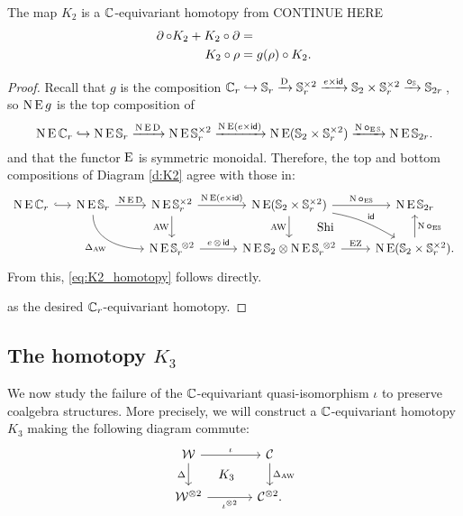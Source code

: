 \begin{lemma}
	The map $K_2$ is a $\mathbb{C}$-equivariant homotopy from CONTINUE HERE
	\begin{align}
		\label{eq:K2_homotopy}
		\operatorname{\partial} \circ K_2 + K_2 \circ \operatorname{\partial} &=  \\
		\label{eq:K2_equivariant}
		K_2 \circ \rho &= g(\rho) \circ K_2.
	\end{align}
\end{lemma}

\begin{proof}
	Recall that $g$ is the composition $\mathbb{C}_r \hookrightarrow \mathbb{S}_r \xrightarrow{\mathrm{D}} \mathbb{S}_r^{\times 2} \xrightarrow{e \times \mathsf{id}} \mathbb{S}_2 \times \mathbb{S}_r^{\times 2} \xrightarrow{\bm{\circ}_{\mathbb{S}}} \mathbb{S}_{2r}$\,, so $\operatorname{N}\operatorname{E} g$ is the top composition of
	\[
	\operatorname{N}\operatorname{E}\mathbb{C}_r \hookrightarrow \operatorname{N}\operatorname{E}\mathbb{S}_r \xrightarrow{\operatorname{N}\operatorname{E}\mathrm{D}} \operatorname{N}\operatorname{E} \mathbb{S}_r^{\times 2} \xrightarrow{\operatorname{N}\operatorname{E}(e \times \mathsf{id})} \operatorname{N}\operatorname{E}(\mathbb{S}_2 \times \mathbb{S}_r^{\times 2}) \xrightarrow{\operatorname{N} \bm{\circ}_{\operatorname{E}\mathbb{S}}} \operatorname{N}\operatorname{E}\mathbb{S}_{2r}.
	\]
	 and that the functor $\operatorname{E}$ is symmetric monoidal.
	Therefore, the top and bottom compositions of Diagram \eqref{d:K2} agree with those in:
	\[
	\begin{tikzcd}
		\chains\EE\cyc_r
		\rar[hook]
		&[-10pt]
		\chains\EE\sym_r
		\rar["\chains\EE\rD"]
		\arrow[dr,in=180,out=-90,"\Delta_{\AW}"'] &
		\chains\EE\sym_r^{\times 2}
		\rar["\chains\EE(e \times \id)"]
		\dar["\AW"'] &[7pt]
		\chains\EE(\sym_2 \times \sym_r^{\times 2})
		\rar["\chains\bcirc_{\EE\!\sym}"]
		\dar["\AW"']
		\drar["\id",out=-10,in=150] &
		\chains\EE\sym_{2r} \\ & &
		\chains\EE\sym_r^{\ \ot 2}
		\rar["e \,\ot\, \id"] &
		\chains\EE\sym_2 \ot \chains\EE\sym_r^{\ \ot 2}
		\rar["\EZ"]
		\uar["\Shi",phantom,shift right=30pt] &
		\chains\EE(\sym_2 \times \sym_r^{\times 2}).
		\uar["\chains\bcirc_{\EE\!\sym}"']
	\end{tikzcd}
	\]
	From this, \cref{eq:K2_homotopy} follows directly.

	as the desired $\mathbb{C}_r$-equivariant homotopy.
\end{proof}

\subsection{The homotopy $K_3$}\label{ss:coproduct}

We now study the failure of the $\mathbb{C}$-equivariant quasi-isomorphism $\iota$ to preserve coalgebra structures.
More precisely, we will construct a $\mathbb{C}$-equivariant homotopy $K_3$ making the following diagram commute:
\begin{equation}\label{d:coproducts}
	\begin{tikzcd}[column sep=large]
			\cW \arrow[r,"\iota"] \arrow[d,"\Delta"'] \arrow[dr,phantom,"K_3"]&
			\cC \arrow[d,"\Delta_{\AW}"] \\
			\cW^{\ot 2} \arrow[r,"\iota^{\ot 2}"'] &
			\cC^{\ot 2}.
		\end{tikzcd}
\end{equation}

